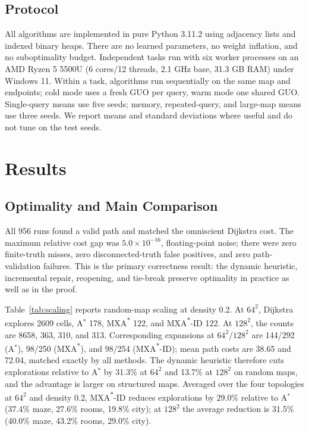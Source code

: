 \documentclass[conference]{IEEEtran}
\newcommand{\MXA}{MXA\textsuperscript{*}}
\newcommand{\MXAID}{MXA\textsuperscript{*}-ID}
\begin{document}
\subsection{Protocol}
All algorithms are implemented in pure Python 3.11.2 using adjacency lists and indexed binary heaps. There are no learned parameters, no weight inflation, and no suboptimality budget. Independent tasks run with six worker processes on an AMD Ryzen 5 5500U (6 cores/12 threads, 2.1 GHz base, 31.3 GB RAM) under Windows 11. Within a task, algorithms run sequentially on the same map and endpoints; cold mode uses a fresh GUO per query, warm mode one shared GUO. Single-query means use five seeds; memory, repeated-query, and large-map means use three seeds. We report means and standard deviations where useful and do not tune on the test seeds.

\section{Results}
\label{sec:results}
\subsection{Optimality and Main Comparison}
All 956 runs found a valid path and matched the omniscient Dijkstra cost. The maximum relative cost gap was $5.0\times10^{-16}$, floating-point noise; there were zero finite-truth misses, zero disconnected-truth false positives, and zero path-validation failures. This is the primary correctness result: the dynamic heuristic, incremental repair, reopening, and tie-break preserve optimality in practice as well as in the proof.

Table~\ref{tab:scaling} reports random-map scaling at density 0.2. At $64^2$, Dijkstra explores 2609 cells, A$^*$ 178, \MXA{} 122, and \MXAID{} 122. At $128^2$, the counts are 8658, 363, 310, and 313. Corresponding expansions at $64^2$/$128^2$ are 144/292 (A$^*$), 98/250 (\MXA{}), and 98/254 (\MXAID{}); mean path costs are 38.65 and 72.04, matched exactly by all methods. The dynamic heuristic therefore cuts explorations relative to A$^*$ by 31.3\% at $64^2$ and 13.7\% at $128^2$ on random maps, and the advantage is larger on structured maps. Averaged over the four topologies at $64^2$ and density 0.2, \MXAID{} reduces explorations by 29.0\% relative to A$^*$ (37.4\% maze, 27.6\% rooms, 19.8\% city); at $128^2$ the average reduction is 31.5\% (40.0\% maze, 43.2\% rooms, 29.0\% city).
\end{document}
